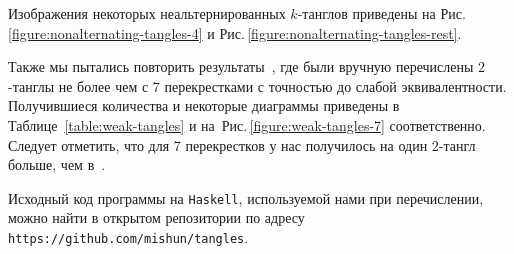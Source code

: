 \documentclass[12pt]{article}
\theoremstyle{plain}
\theoremstyle{definition}
\def\figureref#1{Рис.\,\protect\ref{#1}}
\begin{document}
		Изображения некоторых неальтернированных $k$-танглов приведены на \figureref{figure:nonalternating-tangles-4} и
		\figureref{figure:nonalternating-tangles-rest}.

		Также мы пытались повторить результаты~\cite{KanenobuSaitoSatoh2003}, где были вручную перечислены $2$-танглы не более чем
		с 7 перекрестками с точностью до слабой эквивалентности. Получившиеся количества и некоторые диаграммы приведены в
		Таблице~\ref{table:weak-tangles} и на~\figureref{figure:weak-tangles-7} соответственно. Следует отметить, что для 7
		перекрестков у нас получилось на один $2$-тангл больше, чем в~\cite{KanenobuSaitoSatoh2003}.

		Исходный код программы на \texttt{Haskell}, используемой нами при перечислении, можно найти в открытом репозитории по
		адресу \texttt{https://github.com/mishun/tangles}.
\end{document}
